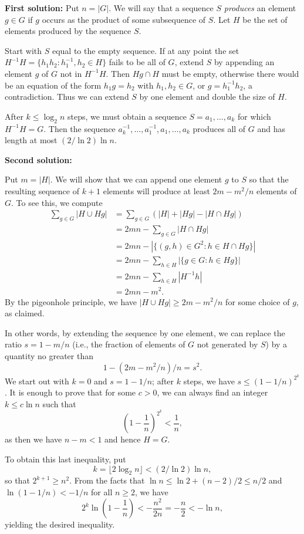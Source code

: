 \documentclass[amssymb,twocolumn,pra,10pt,aps]{revtex4-1}
\begin{document}
\begin{itemize}
\textbf{First solution:}
Put $n = |G|$.
We will say that a sequence $S$ \emph{produces}
an element $g \in G$ if $g$ occurs as the product of some subsequence
of $S$.
Let $H$ be the set of elements produced by the sequence $S$.

Start with $S$ equal to the empty sequence. If at any point
the set $H^{-1}H = \{h_1 h_2: h_1^{-1}, h_2 \in H\}$ fails to be
all of $G$, extend $S$ by appending an element $g$ of $G$ not in
$H^{-1} H$. Then $Hg \cap H$ must be empty, otherwise there would
be an equation of the form $h_1 g= h_2 $ with $h_1, h_2 \in G$,
or $g = h_1^{-1} h_2$, a contradiction. Thus we can extend $S$ by one
element and double the size of $H$.

After $k \leq \log_2 n$ steps, we must obtain a sequence $S
= a_1,\dots,a_k$ for which $H^{-1} H = G$. Then
the sequence $a_k^{-1}, \dots, a_1^{-1}, a_1, \dots, a_k$
produces all of $G$ and has length at most $(2/\ln 2) \ln n$.

\textbf{Second solution:}

Put $m = |H|$. We will show that we can append one element
$g$ to $S$ so that the resulting sequence of $k+1$ elements will produce
at least $2m-m^2/n$ elements of $G$. To see this, we compute
\begin{align*}
\sum_{g \in G} |H \cup Hg|
&= \sum_{g \in G} (|H| + |Hg| - |H \cap Hg|) \\
&= 2mn - \sum_{g \in G} |H \cap Hg| \\
&= 2mn - |\{(g,h) \in G^2: h \in H \cap Hg\}| \\
&= 2mn - \sum_{h \in H} |\{g \in G: h \in Hg\}| \\
&= 2mn - \sum_{h \in H} |H^{-1} h| \\
&= 2mn - m^2.
\end{align*}
By the pigeonhole principle, we have $|H \cup Hg| \geq 2m - m^2/n$ for
some choice of $g$, as claimed.

In other words, by extending the sequence by one element,
we can replace the ratio $s = 1-m/n$ (i.e., the fraction
of elements of $G$ not generated by $S$)
by a quantity no greater than
\[
1-(2m-m^2/n)/n = s^2.
\]
We start out with $k = 0$ and $s = 1 - 1/n$;
after $k$ steps, we have $s \leq (1-1/n)^{2^k}$.
It is enough to prove that for some $c > 0$, we can always find
an integer $k \leq c \ln n$ such that
\[
\left(1 - \frac{1}{n} \right)^{2^k} < \frac{1}{n},
\]
as then we have $n-m < 1$ and hence $H = G$.

To obtain this last inequality, put
\[
k = \lfloor 2 \log_2 n \rfloor < (2/\ln 2) \ln n,
\]
so that $2^{k+1} \geq n^2$.
From the facts that $\ln n \leq \ln 2 + (n-2)/2 \leq n/2$ and
$\ln (1-1/n) < -1/n$ for all $n \geq 2$, we have
\[
2^k \ln \left( 1 - \frac{1}{n} \right) < -\frac{n^2}{2n} =  -\frac{n}{2} < -\ln n,
\]
yielding the desired inequality.


\end{itemize}
\end{document}
